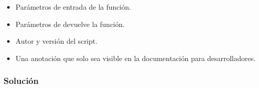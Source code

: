 \begin{itemize}
    \item Parámetros de entrada de la función.
    \item Parámetros de devuelve la función.
    \item Autor y versión del script.
    \item Una anotación que solo sea visible en la documentación para desarrolladores.
\end{itemize}

\subsubsection{Solución}




%

